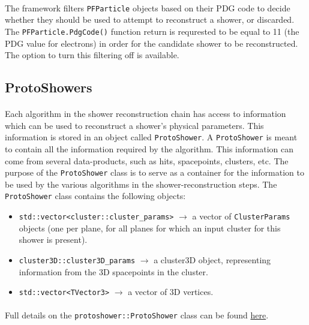 \paragraph{}The framework filters \texttt{PFParticle} objects based on their PDG code to decide whether they should be used to attempt to reconstruct a shower, or discarded. The \texttt{PFParticle.PdgCode()} function return is requrested to be equal to 11 (the PDG value for electrons) in order for the candidate shower to be reconstructed. The option to turn this filtering off is available.

\subsection{ProtoShowers}
\label{subsec:protoshower}
\paragraph{}Each algorithm in the shower reconstruction chain has access to information which can be used to reconstruct a shower's physical parameters. This information is stored in an object called \texttt{ProtoShower}. A \texttt{ProtoShower} is meant to contain all the information required by the algorithm. This information can come from several data-products, such as hits, spacepoints, clusters, etc. The purpose of the \texttt{ProtoShower} class is to serve as a container for the information to be used by the various algorithms in the shower-reconstruction steps. The \texttt{ProtoShower} class contains the following objects:
\begin{itemize}
\item \texttt{std::vector<cluster::cluster\_params>} $\rightarrow$ a vector of \texttt{ClusterParams} objects (one per plane, for all planes for which an input cluster for this shower is present).
\item \texttt{cluster3D::cluster3D\_params} $\rightarrow$ a cluster3D object, representing information from the 3D spacepoints in the cluster.
\item \texttt{std::vector<TVector3>} $\rightarrow$ a vector of 3D vertices.
\end{itemize}
\paragraph{}Full details on the \texttt{protoshower::ProtoShower} class can be found \href{https://github.com/larlight/larlite/blob/trunk/UserDev/RecoTool/ShowerReco3D/ProtoShower/ProtoShower.h}{here}.
